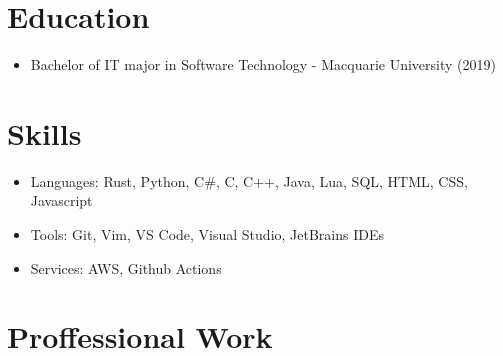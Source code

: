 \documentclass[line, resMargin, a4paper]{res}
\begin{document}
\address{
    \href{https://github.com/rukai}{github.com/rukai}\\
    Ph: +61 449 123 093\\
    Email: rubickent@gmail.com
}

\begin{resume}
    \section{Education}
    \begin{itemize}
        \item Bachelor of IT major in Software Technology - Macquarie University (2019)
    \end{itemize}

    \section{Skills}
    \begin{itemize}
        \item Languages: Rust, Python, C\#, C, C++, Java, Lua, SQL, HTML, CSS, Javascript
        \item Tools: Git, Vim, VS Code, Visual Studio, JetBrains IDEs
        \item Services: AWS, Github Actions
    \end{itemize}

    \section{Proffessional Work}


\end{resume}
\end{document}
